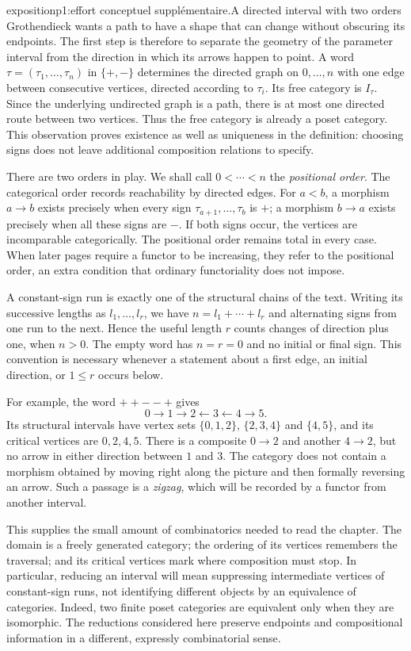 \begin{dcomment}{exposition}{p1:effort conceptuel supplémentaire.}{A directed interval with two orders}
Grothendieck wants a path to have a shape that can change without obscuring its endpoints. The first step is therefore to separate the geometry of the parameter interval from the direction in which its arrows happen to point. A word $\tau=(\tau_1,\ldots,\tau_n)$ in $\{+,-\}$ determines the directed graph on $0,\ldots,n$ with one edge between consecutive vertices, directed according to $\tau_i$. Its free category is $I_\tau$. Since the underlying undirected graph is a path, there is at most one directed route between two vertices. Thus the free category is already a poset category. This observation proves existence as well as uniqueness in the definition: choosing signs does not leave additional composition relations to specify.

There are two orders in play. We shall call $0<\cdots<n$ the \emph{positional order}. The categorical order records reachability by directed edges. For $a<b$, a morphism $a\longrightarrow b$ exists precisely when every sign $\tau_{a+1},\ldots,\tau_b$ is $+$; a morphism $b\longrightarrow a$ exists precisely when all these signs are $-$. If both signs occur, the vertices are incomparable categorically. The positional order remains total in every case. When later pages require a functor to be increasing, they refer to the positional order, an extra condition that ordinary functoriality does not impose.

A constant-sign run is exactly one of the structural chains of the text. Writing its successive lengths as $l_1,\ldots,l_r$, we have $n=l_1+\cdots+l_r$ and alternating signs from one run to the next. Hence the useful length $r$ counts changes of direction plus one, when $n>0$. The empty word has $n=r=0$ and no initial or final sign. This convention is necessary whenever a statement about a first edge, an initial direction, or $1\leq r$ occurs below.

For example, the word $++--+$ gives
\[
0\longrightarrow1\longrightarrow2\longleftarrow3\longleftarrow4\longrightarrow5.
\]
Its structural intervals have vertex sets $\{0,1,2\}$, $\{2,3,4\}$ and $\{4,5\}$, and its critical vertices are $0,2,4,5$. There is a composite $0\to2$ and another $4\to2$, but no arrow in either direction between $1$ and $3$. The category does not contain a morphism obtained by moving right along the picture and then formally reversing an arrow. Such a passage is a \emph{zigzag}, which will be recorded by a functor from another interval.

This supplies the small amount of combinatorics needed to read the chapter. The domain is a freely generated category; the ordering of its vertices remembers the traversal; and its critical vertices mark where composition must stop. In particular, reducing an interval will mean suppressing intermediate vertices of constant-sign runs, not identifying different objects by an equivalence of categories. Indeed, two finite poset categories are equivalent only when they are isomorphic. The reductions considered here preserve endpoints and compositional information in a different, expressly combinatorial sense.
\end{dcomment}

